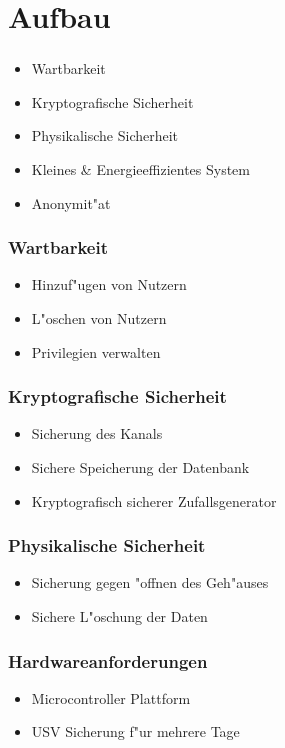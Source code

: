 \section{Aufbau}
\begin{frame}
\frametitle{}
	\begin{itemize}
		\item<2-> Wartbarkeit
		\item<3-> Kryptografische Sicherheit
		\item<4-> Physikalische Sicherheit
		\item<5-> Kleines \& Energieeffizientes System
		\item<6-> Anonymit"at
	\end{itemize}
\end{frame}

\begin{frame}
\frametitle{Wartbarkeit}
	\begin{itemize}
		\item<2-> Hinzuf"ugen von Nutzern
		\item<3-> L"oschen von Nutzern
		\item<4-> Privilegien verwalten
	\end{itemize}
\end{frame}

\begin{frame}
\frametitle{Kryptografische Sicherheit}
	\begin{itemize}
		\item<2-> Sicherung des Kanals
		\item<3-> Sichere Speicherung der Datenbank
		\item<4-> Kryptografisch sicherer Zufallsgenerator
	\end{itemize}
\end{frame}

\begin{frame}
\frametitle{Physikalische Sicherheit}
	\begin{itemize}
		\item<2-> Sicherung gegen "offnen des Geh"auses
		\item<3-> Sichere L"oschung der Daten
	\end{itemize}
\end{frame}

\begin{frame}
\frametitle{Hardwareanforderungen}
	\begin{itemize}
		\item<2-> Microcontroller Plattform
		\item<3-> USV Sicherung f"ur mehrere Tage
	\end{itemize}
\end{frame}
